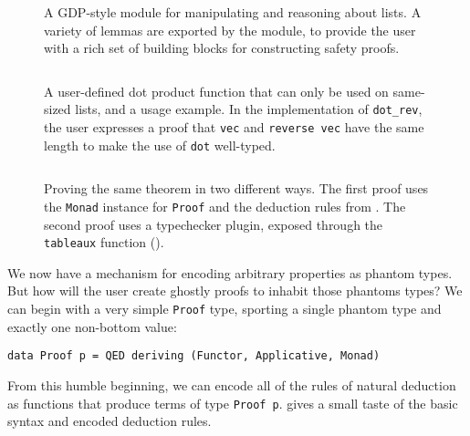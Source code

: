 \documentclass[format=sigplan, review=false, screen=true]{acmart}
\makeatletter
\let\origsubsection\subsection
\renewcommand\subsection{\@ifstar{\starsubsection}{\nostarsubsection}}
\newcommand\nostarsubsection[1]
{\subsectionprelude\origsubsection{#1}\subsectionpostlude}
\newcommand\starsubsection[1]
{\subsectionprelude\origsubsection*{#1}\subsectionpostlude}
\newcommand\subsectionprelude{%
  \vspace{-0.25em}
}
\newcommand\subsectionpostlude{%
  \vspace{-0.05em}
}
\makeatother
\begin{document}
\begin{figure}
    \inputminted{haskell}{ex1.hs}
    \caption{A GDP-style module for manipulating and reasoning about lists.
      A variety of lemmas are exported by the module, to provide the
      user with a rich set of building blocks for constructing safety proofs.
       \label{lemma-demo}}
\end{figure}
\begin{figure}
    \inputminted{haskell}{ex2.hs}
    \caption{A user-defined dot product function that can only be used on same-sized lists,
      and a usage example. In the implementation of \texttt{dot\_rev}, the user expresses a proof that
      \texttt{vec} and \texttt{reverse vec} have the same length to make the use of \texttt{dot}
       well-typed.\label{dot-product}}
\end{figure}

\subsection{An EDSL for ghostly proofs}


\begin{figure}[b]
  \inputminted{haskell}{tableaux.hs}
  \caption{Proving the same theorem in two different ways. The first proof
    uses the \texttt{Monad} instance for
    \texttt{Proof} and the deduction rules from . The second
    proof uses a typechecker plugin, exposed through the \texttt{tableaux}
    function ().
    \label{tableaux-example}}
\end{figure}
We now have a mechanism for encoding arbitrary properties as phantom types. But how will the user
create ghostly proofs to inhabit those phantoms types?
We can begin with a very simple \texttt{Proof} type,
sporting a single phantom type and exactly one non-bottom value:
\begin{verbatim}
data Proof p = QED deriving (Functor, Applicative, Monad)
\end{verbatim} 
From this humble beginning, we can encode all of the rules of natural deduction as functions that
produce terms of type \texttt{Proof p}.
 gives a small taste of the basic syntax and encoded deduction rules.
\end{document}
